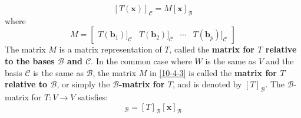     \begin{equation}\label{10-4-3}
        [T(\mathbf{x})]_{\mathcal{C}} = M[\mathbf{x}]_{\mathcal{B}}
    \end{equation}     
    where
    \begin{equation*}
        M = \begin{bmatrix}
            T(\mathbf{b}_1)]_{\mathcal{C}} & T(\mathbf{b}_2)]_{\mathcal{C}} & \cdots & T(\mathbf{b}_p)]_{\mathcal{C}}
        \end{bmatrix}
    \end{equation*}
    The matrix $M$ is a matrix representation of $T$, called the \textbf{matrix for $T$ relative to the bases $\mathcal{B}$ and $\mathcal{C}$}.
    In the common case where $W$ is the same as $V$ and the basis $\mathcal{C}$ is the same as $\mathcal{B}$, the matrix $M$ in \cref{10-4-3} is called the \textbf{matrix for $T$ relative to $\mathcal{B}$}, or simply the \textbf{$\mathcal{B}$-matrix for $T$}, and is denoted by $[T]_{\mathcal{B}}$.
        The $\mathcal{B}$-matrix for $T: V\to V$ satisfies:
        \begin{equation*}
            [T(\mathbf{x})]_{\mathcal{B}} = [T]_{\mathcal{B}}[\mathbf{x}]_{\mathcal{B}}
        \end{equation*}
